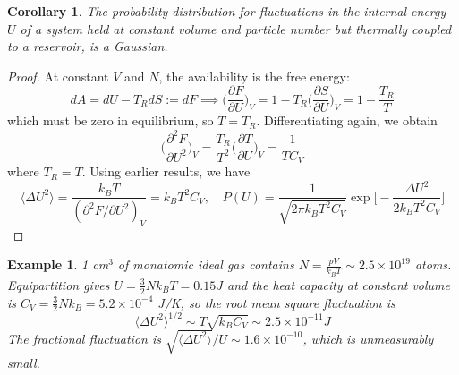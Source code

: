 \documentclass[a4paper]{article}
\newtheorem{eg}{Example}[section]
\theoremstyle{new}
\newtheorem{cor}{Corollary}[section]
\begin{document}
\begin{cor}
The probability distribution for fluctuations in the internal energy $U$ of a system held at constant volume and particle number but thermally coupled to a reservoir, is a Gaussian.
\end{cor}
\begin{proof}
At constant $V$ and $N$, the availability is the free energy:
$$dA=dU-T_RdS:=dF\implies\bigg(\frac{\partial F}{\partial U}\bigg)_V=1-T_R\bigg(\frac{\partial S}{\partial U}\bigg)_V=1-\frac{T_R}{T}$$
which must be zero in equilibrium, so $T=T_R$. Differentiating again, we obtain
$$\bigg(\frac{\partial^2F}{\partial U^2}\bigg)_V=\frac{T_R}{T^2}\bigg(\frac{\partial T}{\partial U}\bigg)_V=\frac{1}{TC_V}$$
where $T_R=T$. Using earlier results, we have
$$\langle\Delta U^2\rangle=\frac{k_BT}{(\partial^2F/\partial U^2)_V}=k_BT^2C_V,\quad P(U)=\frac{1}{\sqrt{2\pi k_BT^2C_V}}\exp\bigg[-\frac{\Delta U^2}{2k_BT^2C_V}\bigg]$$
\end{proof}
\begin{eg}
1 cm$^3$ of monatomic ideal gas contains $N=\frac{pV}{k_BT}\sim 2.5\times10^{19}$ atoms. Equipartition gives $U=\frac{3}{2}Nk_BT=0.15J$ and the heat capacity at constant volume is $C_V=\frac{3}{2}Nk_B=5.2\times10^{-4}$ J/K, so the root mean square fluctuation is
$$\langle\Delta U^2\rangle^{1/2}\sim T\sqrt{k_BC_V}\sim 2.5\times10^{-11}J$$
The fractional fluctuation is $\sqrt{\langle\Delta U^2\rangle}/U\sim 1.6\times10^{-10}$, which is unmeasurably small. 
\end{eg}
\newpage
\end{document}
